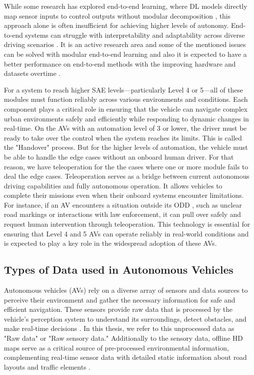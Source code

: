 While some research has explored end-to-end learning, where \ac{DL} models directly map sensor inputs
to control outputs without modular decomposition \cite{codevilla2019limitations}, this approach alone is often
insufficient for achieving higher levels of autonomy. End-to-end systems can struggle with interpretability
and adaptability across diverse driving scenarios \cite{e2e}. It is an active research area and some
of the mentioned issues can be solved with modular end-to-end learning \cite{nvidia2022diffstack} and also
it is expected to have a better performance on end-to-end methods with the improving hardware and datasets overtime \cite{e2e}.

For a system to reach higher SAE levels—particularly Level 4 or 5—all of
these modules must function reliably across various environments and conditions.
Each component plays a critical role in ensuring that the vehicle can navigate complex urban
environments safely and efficiently while responding to dynamic changes in real-time.
On the \acp{AV} with an automation level of 3 or lower, the driver must be ready to take over the control
when the system reaches its limits. This is called the "Handover" process.
But for the higher levels of automation, the vehicle must be able to handle the edge cases without an onboard human driver.
For that reason, we have teleoperation for the the cases where one or more module fails to deal the edge cases.
Teleoperation serves as a bridge between current autonomous driving capabilities and fully autonomous operation.
It allows vehicles to complete their missions even when their onboard systems encounter limitations.
For instance, if an \ac{AV} encounters a situation outside its \ac{ODD} \cite{iso34503},
such as unclear road markings or interactions with law enforcement, it can pull over safely and request human
intervention through teleoperation.
This technology is essential for ensuring that Level 4 and 5 \acp{AV} can operate reliably in real-world conditions
and is expected to play a key role in the widespread adoption of these \acp{AV}.


\subsection{Types of Data used in Autonomous Vehicles} \label{subsection:sensors}
Autonomous vehicles (\acp{AV}) rely on a diverse array of sensors and data sources to perceive their environment and gather the necessary
information for safe and efficient navigation. These sensors provide raw data that is
processed by the vehicle's perception system to understand
its surroundings, detect obstacles, and make real-time
decisions \cite{thrun2006stanley}.
In this thesis, we refer to this unprocessed data as
"Raw data" or "Raw sensory data." Additionally to the sensory data,
offline HD maps serve as a critical source of pre-processed environmental information,
complementing real-time sensor data with detailed static information about road layouts
and traffic elements \cite{bansal2018hdmaps,zhu2021hdmaps}.

